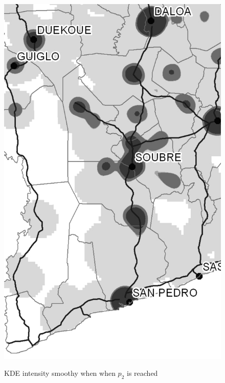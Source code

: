 \begin{figure}[h!]
{    \includegraphics[scale = 0.1]{results/images/kernel/l_hour20_kd_detail.pdf}
	\label{fig:subfig2_detail}
}
\caption[KDE intensity smoothy when $p_2$ is reached]{KDE intensity smoothy when when  $p_2$ is reached}
\label{fig:subfigureExample}
\end{figure}




\newpage

